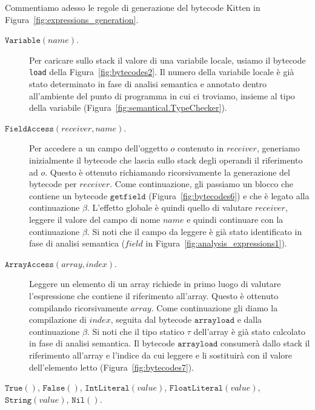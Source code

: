 Commentiamo adesso le regole di generazione del bytecode Kitten in
Figura~\ref{fig:expressions_generation}.
%
\begin{description}
\item[\underline{$\mathtt{Variable(\mathit{name})}$}.]
  Per caricare sullo stack il valore di una variabile locale, usiamo
  il bytecode \texttt{load} della Figura~\ref{fig:bytecodes2}.
  Il numero della variabile locale \`e gi\`a stato determinato in
  fase di analisi semantica e annotato dentro all'ambiente del
  punto di programma in cui ci troviamo, insieme al tipo della variabile
  (Figura~\ref{fig:semantical.TypeChecker}).
\item[\underline{$\mathtt{FieldAccess(\mathit{receiver},\mathit{name})}$}.]
  Per accedere a un campo dell'oggetto $o$
  contenuto in $\mathit{receiver}$,
  generiamo inizialmente il bytecode che lascia sullo stack degli operandi
  il riferimento ad $o$. Questo \`e ottenuto richiamando ricorsivamente
  la generazione del bytecode per $\mathit{receiver}$. Come continuazione,
  gli passiamo un blocco che contiene un bytecode
  $\mathtt{getfield}$ (Figura~\ref{fig:bytecodes6})
  e che \`e legato alla continuazione $\beta$.
  L'effetto globale \`e quindi quello di valutare $\mathit{receiver}$,
  leggere il valore del campo di nome $\mathit{name}$ e quindi continuare
  con la continuazione $\beta$. Si noti che il campo da leggere \`e gi\`a
  stato identificato in fase di analisi semantica ($\mathit{field}$ in
  Figura~\ref{fig:analysis_expressions1}).
\item[\underline{$\mathtt{ArrayAccess(\mathit{array},\mathit{index})}$}.]
  Leggere un elemento di un array richiede in primo luogo di
  valutare l'espressione che contiene il riferimento all'array. Questo \`e
  ottenuto compilando ricorsivamente $\mathit{array}$. Come continuazione
  gli diamo la compilazione di $\mathit{index}$, seguita dal bytecode
  $\mathtt{arrayload}$ e dalla
  continuazione $\beta$. Si noti che il tipo statico $\tau$
  dell'array \`e gi\`a stato calcolato in fase di analisi semantica.
  Il bytecode $\mathtt{arrayload}$ consumer\`a dallo stack
  il riferimento all'array e l'indice da cui leggere e li sostituir\`a
  con il valore dell'elemento letto (Figura~\ref{fig:bytecodes7}).
\item[\underline{$\mathtt{True()}$},
      \underline{$\mathtt{False()}$},
      \underline{$\mathtt{IntLiteral(\mathit{value})}$},
      \underline{$\mathtt{FloatLiteral(\mathit{value})}$},
      \underline{$\mathtt{String(\mathit{value})}$},
      \underline{$\mathtt{Nil()}$}.]

\end{description}
